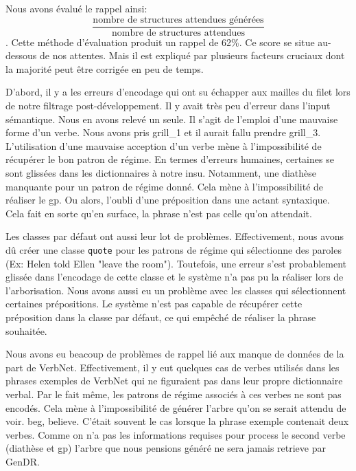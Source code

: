 Nous avons évalué le rappel ainsi:\[\frac{\text{nombre de structures attendues générées}}{\text{nombre de structures attendues}}\]. Cette méthode d'évaluation produit un rappel de 62\%. Ce score se situe au-dessous de nos attentes. Mais il est expliqué par plusieurs facteurs cruciaux dont la majorité peut être corrigée en peu de temps. 

D'abord, il y a les erreurs d'encodage qui ont su échapper aux mailles du filet lors de notre filtrage post-développement. Il y avait très peu d'erreur dans l'input sémantique. Nous en avons relevé un seule. Il s'agit de l'emploi d'une mauvaise forme d'un verbe. Nous avons pris grill\_1 et il aurait fallu prendre grill\_3. L'utilisation d'une mauvaise acception d'un verbe mène à l'impossibilité de récupérer le bon patron de régime. En termes d'erreurs humaines, certaines se sont glissées dans les dictionnaires à notre insu. Notamment, une diathèse manquante pour un patron de régime donné. Cela mène à l'impossibilité de réaliser le gp. Ou alors, l'oubli d'une préposition dans une actant syntaxique. Cela fait en sorte qu'en surface, la phrase n'est pas celle qu'on attendait.

Les classes par défaut ont aussi leur lot de problèmes. Effectivement, nous avons dû créer une classe \texttt{quote} pour les patrons de régime qui sélectionne des paroles (Ex: Helen told Ellen "leave the room"). Toutefois, une erreur s'est probablement glissée dans l'encodage de cette classe et le système n'a pas pu la réaliser lors de l'arborisation. Nous avons aussi eu un problème avec les classes qui sélectionnent certaines prépositions. Le système n'est pas capable de récupérer cette préposition dans la classe par défaut, ce qui empêché de réaliser la phrase souhaitée. 

Nous avons eu beacoup de problèmes de rappel lié aux manque de données de la part de VerbNet. Effectivement, il y eut quelques cas de verbes utilisés dans les phrases exemples de VerbNet qui ne figuraient pas dans leur propre dictionnaire verbal. Par le fait même, les patrons de régime associés à ces verbes ne sont pas encodés. Cela mène à l'impossibilité de générer l'arbre qu'on se serait attendu de voir. beg, believe. C'était souvent le cas lorsque la phrase exemple contenait deux verbes. Comme on n'a pas les informations requises pour process le second verbe (diathèse et gp) l'arbre que nous pensions généré ne sera jamais retrieve par GenDR. 

